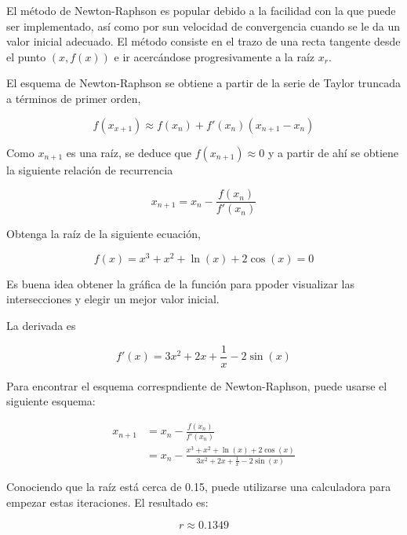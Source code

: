 El método de Newton-Raphson es popular debido a la facilidad con la que puede
ser implementado, así como por sun velocidad de convergencia cuando se le da un
valor inicial adecuado. El método consiste en el trazo de una recta tangente
desde el punto $(x, f(x))$ e ir acercándose progresivamente a la raíz $x_r$.

El esquema de Newton-Raphson se obtiene a partir de la serie de Taylor truncada
a términos de primer orden,

\[
	f(x_{x+1}) \approx f(x_n) + f'(x_n)(x_{n+1} - x_n)
\]

Como $x_{n+1}$ es una raíz, se deduce que $f(x_{n+1}) \approx 0$ y a partir de
ahí se obtiene la siguiente relación de recurrencia

\begin{equation}\label{eqn:newton}
	x_{n+1} = x_n - \frac{f(x_n)}{f'(x_n)}
\end{equation}

\begin{ex}
	Obtenga la raíz de la siguiente ecuación,

	\[
		f(x) = x^3 + x^2 + \ln(x) + 2 \cos(x) = 0
	\]

	\begin{solution}

		Es buena idea obtener la gráfica de la función para ppoder
		visualizar las intersecciones y elegir un mejor valor inicial.

		La derivada es 

		\[
			f'(x) = 3x^2 + 2x + \frac{1}{x} - 2 \sin(x)
		\]

		Para encontrar el esquema correspndiente de Newton-Raphson,
		puede usarse el siguiente esquema:

		\begin{align*}
			x_{n+1} &= x_n - \frac{f(x_n)}{f'(x_n)} \\
				&= x_n - \frac{x^3 + x^2 + \ln(x) + 2
				\cos(x)}{3x^2 + 2x + \frac{1}{x} - 2 \sin(x)}
		\end{align*}

		Conociendo que la raíz está cerca de 0.15, puede utilizarse una
		calculadora para empezar estas iteraciones. El resultado es:

		\[
			\boxed{r \approx 0.1349}
		\]

	\end{solution}

\end{ex}

